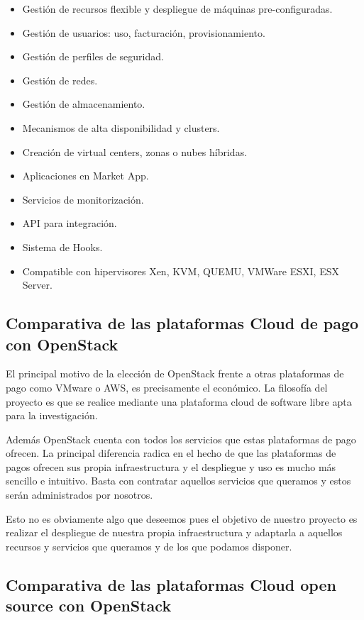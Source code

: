 \begin{itemize}
\item Gestión de recursos flexible y despliegue de máquinas pre-configuradas.
\item Gestión de usuarios: uso, facturación, provisionamiento.
\item Gestión de perfiles de seguridad.
\item Gestión de redes.
\item Gestión de almacenamiento.
\item Mecanismos de alta disponibilidad y clusters.
\item Creación de virtual centers, zonas o nubes híbridas.
\item Aplicaciones en Market App.
\item Servicios de monitorización. 
\item API para integración.
\item Sistema de Hooks.
\item Compatible con hipervisores Xen, KVM, QUEMU, VMWare ESXI, ESX Server.
\end{itemize}

\subsection{Comparativa de las plataformas Cloud de pago con OpenStack}

El principal motivo de la elección de OpenStack frente a otras plataformas de pago como VMware o AWS, es precisamente el económico. La filosofía del proyecto es que se realice mediante una plataforma cloud de software libre apta para la investigación. 

Además OpenStack cuenta con todos los servicios que estas plataformas de pago ofrecen. La principal diferencia radica en el hecho de que las plataformas de pagos ofrecen sus propia infraestructura y el despliegue y uso es mucho más sencillo e intuitivo. Basta con contratar aquellos servicios que queramos y estos serán administrados por nosotros.

Esto no es obviamente algo que deseemos pues el objetivo de nuestro proyecto es realizar el despliegue de nuestra propia infraestructura y adaptarla a aquellos recursos y servicios que queramos y de los que podamos disponer.

\subsection{Comparativa de las plataformas Cloud open source con OpenStack}

